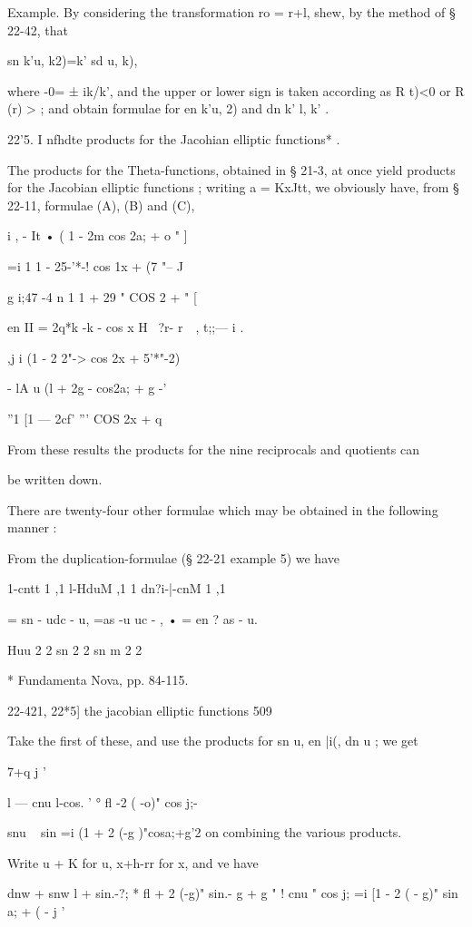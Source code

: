 Example. By considering the transformation ro = r+l, shew, by the
method of § 22-42, that

sn k'u, k2)=k' sd u, k),

where -0= ± ik/k', and the upper or lower sign is taken according as R
t)<0 or R (r) > ; and obtain formulae for en k'u, 2) and dn k' l, k' .

22'5. I nfhdte products for the Jacohian elliptic functions* .

The products for the Theta-functions, obtained in § 21-3, at once
yield products for the Jacobian elliptic functions ; writing a =
KxJtt, we obviously have, from § 22-11, formulae (A), (B) and (C),

  i , - It • ( 1 - 2m cos 2a; + o " ]

   =i 1 1 - 25-'*-! cos 1x + (7 "-- J

g i;47 -4 n 1 1 + 29 " COS 2 + " [

en II = 2q*k -k - cos x H \ ?r- r~~, t;;— i .

  ,j i (1 - 2 2"-> cos 2x + 5'*"-2)

- lA u (l + 2g - cos2a; + g -'

''1 [1 — 2cf' ''' COS 2x + q

From these results the products for the nine reciprocals and quotients
can

be written down.

There are twenty-four other formulae which may be obtained in the
following manner :

From the duplication-formulae (§ 22-21 example 5) we have

1-cntt 1 ,1 l-HduM ,1 1 dn?i-|-cnM 1 ,1

= sn - udc - u, =as -u uc - , • = en ? as - u.

Huu 2 2 sn 2 2 sn m 2 2

* Fundamenta Nova, pp. 84-115.

22-421, 22*5] the jacobian elliptic functions 509

Take the first of these, and use the products for sn u, en |i(, dn u ;
we get

7+q j '

l — cnu l-cos. ' ° fl -2 ( -o)" cos j;-

snu ~ sin =i (1 + 2 (-g )"cosa;+g'2 on combining the various products.

Write u + K for u, x+h-rr for x, and ve have

dnw + snw l + sin.-?; * fl + 2 (-g)" sin.- g + g " ! cnu " cos j; =i
[1 - 2 ( - g)" sin a; + ( - j '

